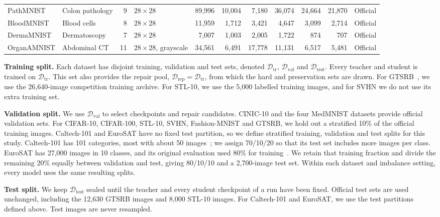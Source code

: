 \documentclass[review,number,sort&compress]{elsarticle}
\theoremstyle{definition}
\begin{document}
\begin{table}[!t]
{\begin{tabular}{@{}llrlrrrrrrl@{}}
\midrule
PathMNIST     & Colon pathology & 9  & $28\times28$              & 89{,}996 & 10{,}004 & 7{,}180  & 36{,}074 & 24{,}664 & 21{,}870 & Official \\
BloodMNIST    & Blood cells    & 8   & $28\times28$              & 11{,}959 & 1{,}712  & 3{,}421  & 4{,}647  & 3{,}099  & 2{,}714  & Official \\
DermaMNIST    & Dermatoscopy   & 7   & $28\times28$              & 7{,}007  & 1{,}003  & 2{,}005  & 1{,}722  & 874      & 707      & Official \\
OrganAMNIST   & Abdominal CT   & 11  & $28\times28$, grayscale   & 34{,}561 & 6{,}491  & 17{,}778 & 11{,}131 & 6{,}517  & 5{,}481  & Official \\
\bottomrule
\end{tabular}}
\end{table}

\textbf{Training split.} Each dataset has disjoint training, validation
and test sets, denoted $\mathcal{D}_{\mathrm{tr}}$,
$\mathcal{D}_{\mathrm{val}}$ and $\mathcal{D}_{\mathrm{test}}$.
Every teacher and student is trained on $\mathcal{D}_{\mathrm{tr}}$.
This set also provides the repair pool,
$\mathcal{D}_{\mathrm{rep}}=\mathcal{D}_{\mathrm{tr}}$, from which the
hard and preservation sets are drawn. For GTSRB~\citep{stallkamp2012man},
we use the 26{,}640-image competition training
archive.
For STL-10, we use the 5{,}000 labelled training images, and for SVHN we
do not use its extra training set.

\textbf{Validation split.} We use $\mathcal{D}_{\mathrm{val}}$ to select
checkpoints and repair candidates. CINIC-10 and the four MedMNIST
datasets provide official validation sets. For CIFAR-10, CIFAR-100,
STL-10, SVHN, Fashion-MNIST and GTSRB, we hold out a stratified 10\% of
the official training images. Caltech-101 and EuroSAT have no fixed
test partition, so we define stratified training, validation and test
splits for this study. Caltech-101 has 101 categories, most with about
50 images~\citep{feifei2004learning}; we assign 70/10/20 so that
its test set includes more images per class. EuroSAT has 27{,}000
images in 10 classes, and its original evaluation used 80\% for
training~\citep{helber2019eurosat}. We retain that training fraction
and divide the remaining 20\% equally between validation and test,
giving 80/10/10 and a 2{,}700-image test set. Within each dataset and
imbalance setting, every model uses the same resulting splits.

\textbf{Test split.} We keep $\mathcal{D}_{\mathrm{test}}$ sealed until
the teacher and every student checkpoint of a run have been fixed.
Official test sets are used unchanged, including the 12{,}630 GTSRB
images and 8{,}000 STL-10 images. For Caltech-101 and EuroSAT, we use
the test partitions defined above. Test images are never resampled.
\end{document}
